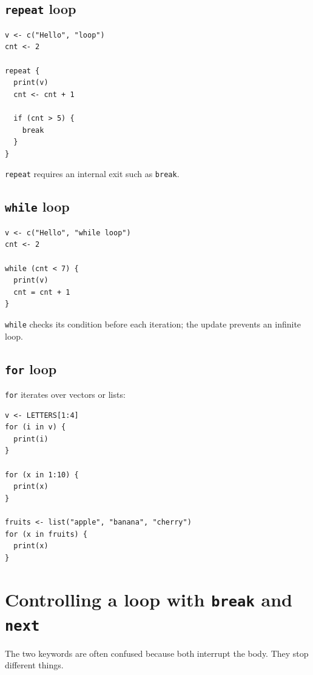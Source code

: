 \subsection{\texttt{repeat} loop}

\begin{lstlisting}[style=dsr]
v <- c("Hello", "loop")
cnt <- 2

repeat {
  print(v)
  cnt <- cnt + 1

  if (cnt > 5) {
    break
  }
}
\end{lstlisting}

\texttt{repeat} requires an internal exit such as \texttt{break}.

\subsection{\texttt{while} loop}

\begin{lstlisting}[style=dsr]
v <- c("Hello", "while loop")
cnt <- 2

while (cnt < 7) {
  print(v)
  cnt = cnt + 1
}
\end{lstlisting}

\texttt{while} checks its condition before each iteration; the update prevents an infinite loop.

\subsection{\texttt{for} loop}

\texttt{for} iterates over vectors or lists:

\begin{lstlisting}[style=dsr]
v <- LETTERS[1:4]
for (i in v) {
  print(i)
}

for (x in 1:10) {
  print(x)
}

fruits <- list("apple", "banana", "cherry")
for (x in fruits) {
  print(x)
}
\end{lstlisting}

\section{Controlling a loop with \texttt{break} and \texttt{next}}

The two keywords are often confused because both interrupt the body. They stop
different things.

